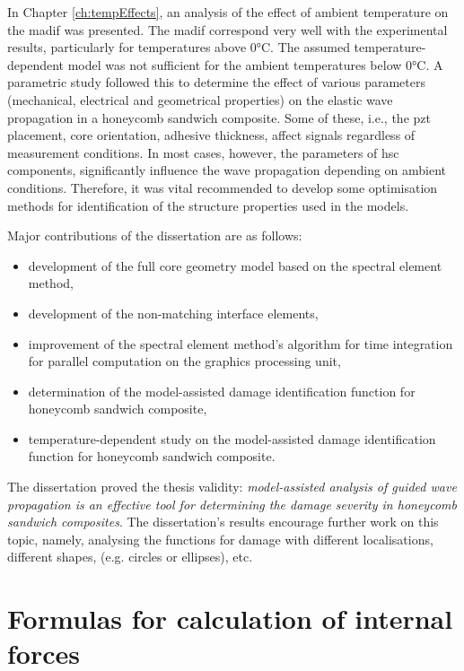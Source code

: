 \documentclass[11pt,a4paper,final]{report}
\theoremstyle{plain}
\begin{document}
In Chapter \ref{ch:tempEffects}, an analysis of the effect of ambient temperature on the \ac{madif} was presented.
The \ac{madif} correspond very well with the experimental results, particularly for temperatures above 0\unit{\degreeCelsius}.
The assumed temperature-dependent model was not sufficient for the ambient temperatures below 0\unit{\degreeCelsius}.
A parametric study followed this to determine the effect of various parameters (mechanical, electrical and geometrical properties) on the elastic wave propagation in a honeycomb sandwich composite. 
Some of these, i.e., the \ac{pzt} placement, core orientation, adhesive thickness, affect signals regardless of measurement conditions.
In most cases, however, the parameters of \ac{hsc} components, significantly influence the wave propagation depending on ambient conditions.
Therefore, it was vital recommended to develop some optimisation methods for identification of the structure properties used in the models.

Major contributions of the dissertation are as follows:
\begin{itemize}
	\item development of the full core geometry model based on the spectral element method,
	\item development of the non-matching interface elements,
	\item improvement of the spectral element method's algorithm for time integration for parallel computation on the graphics processing unit,
	\item determination of the model-assisted damage identification function for honeycomb sandwich composite,
	\item temperature-dependent study on the model-assisted damage identification function for honeycomb sandwich composite.
\end{itemize}

The dissertation proved the thesis validity: \textit{model-assisted analysis of guided wave propagation is an effective tool for determining the damage severity in honeycomb sandwich composites}.
The dissertation's results encourage further work on this topic, namely, analysing the functions for damage with different localisations, different shapes, (e.g. circles or ellipses), etc.
\clearpage{}
\clearpage{}\appendix


\chapter{Formulas for calculation of internal forces}
\label{app:fu}
\end{document}
